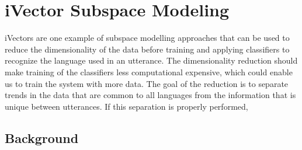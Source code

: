 \chapter{iVector Subspace Modeling}

iVectors are one example of subspace modelling approaches that can be used to reduce the dimensionality of the data before training and applying classifiers to recognize the language used in an utterance. The dimensionality reduction should make training of the classifiers less computational expensive, which could enable us to train the system with more data. The goal of the reduction is to separate trends in the data that are common to all languages from the information that is unique between utterances. If this separation is properly performed, 

\section{Background}

